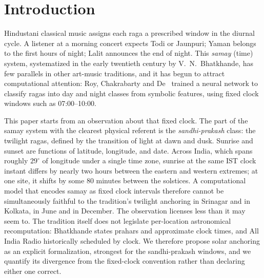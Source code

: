 \documentclass[11pt]{article}
\begin{document}
\section{Introduction}

Hindustani classical music assigns each raga a prescribed window in the
diurnal cycle. A listener at a morning concert expects Todi or Jaunpuri;
Yaman belongs to the first hours of night; Lalit announces the end of night.
This \emph{samay} (time) system, systematized in the early twentieth century
by V.~N.~Bhatkhande, has few parallels in other art-music traditions, and it
has begun to attract computational attention: Roy, Chakrabarty and
De~\cite{roy2017} trained a neural network to classify ragas into day and
night classes from symbolic features, using fixed clock windows such as
07:00--10:00.

This paper starts from an observation about that fixed clock. The part of the
samay system with the clearest physical referent is the
\emph{sandhi-prakash} class: the twilight ragas, defined by the transition of
light at dawn and dusk. Sunrise and sunset are functions of latitude,
longitude, and date. Across India, which spans roughly $29^\circ$ of
longitude under a single time zone, sunrise at the same IST clock instant
differs by nearly two hours between the eastern and western extremes; at one
site, it shifts by some 80 minutes between the solstices. A computational
model that encodes samay as fixed clock intervals therefore cannot be
simultaneously faithful to the tradition's twilight anchoring in Srinagar and
in Kolkata, in June and in December. The observation licenses less than it
may seem to. The tradition itself does not legislate per-location
astronomical recomputation: Bhatkhande states prahars and approximate clock
times, and All India Radio historically scheduled by clock. We therefore
propose solar anchoring as an explicit formalization, strongest for the
sandhi-prakash windows, and we quantify its divergence from the fixed-clock
convention rather than declaring either one correct.
\end{document}
